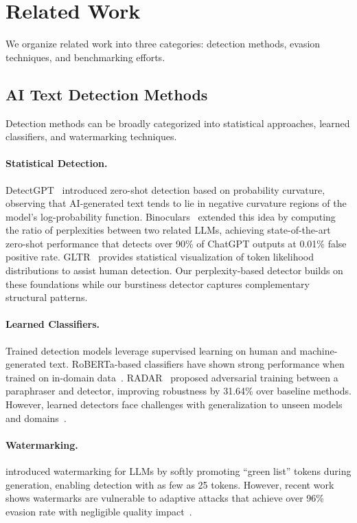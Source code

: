 \section{Related Work}
\label{sec:related}

We organize related work into three categories: detection methods, evasion techniques, and benchmarking efforts.

\subsection{AI Text Detection Methods}

Detection methods can be broadly categorized into statistical approaches, learned classifiers, and watermarking techniques.

\paragraph{Statistical Detection.} DetectGPT~\citep{mitchell2023detectgpt} introduced zero-shot detection based on probability curvature, observing that AI-generated text tends to lie in negative curvature regions of the model's log-probability function. Binoculars~\citep{hans2024binoculars} extended this idea by computing the ratio of perplexities between two related LLMs, achieving state-of-the-art zero-shot performance that detects over 90\% of ChatGPT outputs at 0.01\% false positive rate. GLTR~\citep{gehrmann2019gltr} provides statistical visualization of token likelihood distributions to assist human detection. Our perplexity-based detector builds on these foundations while our burstiness detector captures complementary structural patterns.

\paragraph{Learned Classifiers.} Trained detection models leverage supervised learning on human and machine-generated text. RoBERTa-based classifiers have shown strong performance when trained on in-domain data~\citep{solaiman2019release}. RADAR~\citep{hu2023radar} proposed adversarial training between a paraphraser and detector, improving robustness by 31.64\% over baseline methods. However, learned detectors face challenges with generalization to unseen models and domains~\citep{he2024mgtbench}.

\paragraph{Watermarking.} \citet{kirchenbauer2023watermark} introduced watermarking for LLMs by softly promoting ``green list'' tokens during generation, enabling detection with as few as 25 tokens. However, recent work shows watermarks are vulnerable to adaptive attacks that achieve over 96\% evasion rate with negligible quality impact~\citep{diaa2024adaptive}.

